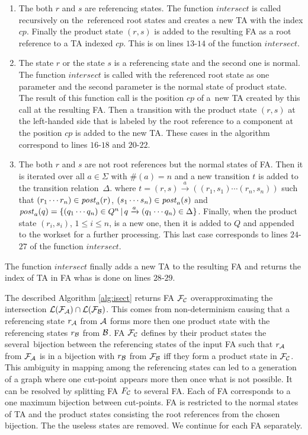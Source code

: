 \begin{enumerate}
	\item The both $r$ and $s$ are referencing states.
		The function $\mathit{intersect}$ is called recursively on the~referenced
		  root states and creates a new TA with the index $cp$.
		  Finally the product state $(r,s)$ is added to the resulting FA
		  as a root reference to a TA indexed $cp$.
		  This is on lines $13$-$14$ of the function $\mathit{intersect}$.
	  \item The state $r$ or the state $s$ is a referencing state and the second one is normal.
			The function $\mathit{intersect}$ is called with the referenced root state as one parameter
			and the second parameter is the normal state of product state.
    		The result of this function call is the position $cp$
			of a~new TA created by this call at the resulting FA.
    		Then a transition with the product state $(r,s)$ at the left-handed side
			that is labeled by the root reference to a component at the position $cp$
			is added to the new TA.
    		These cases in the algorithm correspond to lines $16$-$18$ and $20$-$22$.
	  \item The both $r$ and $s$ are not root references
			but the normal states of FA.
			Then it is iterated over all $a \in \Sigma$ with $\#(a) = n$
			and a new transition $t$ is added to the transition relation~$\Delta$.
			where $t = (r,s) \xrightarrow{a} ((r_1,s_1) \cdots (r_n, s_n))$ such that
			$(r_1 \cdots r_n) \in \mathit{post}_{a}(r)$, $(s_1 \cdots s_n) \in \mathit{post}_{a}(s)$ and
			$\mathit{post}_{a}(q) = \{(q_1 \cdots q_n) \in Q^n\,|\, q \xrightarrow{a} (q_1 \cdots q_n) \in \Delta\}$.
			Finally, when the product state $(r_i,s_i)$, $1 \leq i \leq n$, is a new one,
			then it is added to $Q$ and appended to the workset for a further processing.
			This last case corresponds to lines $24$-$27$ of the function $\mathit{intersect}$.
\end{enumerate}

The function $\mathit{intersect}$ finally adds a new TA to the resulting FA
and returns the index of TA in FA whas is done on lines $28$-$29$.

The described Algorithm \ref{alg:isect} returns FA $\mathcal{F}_{\mathcal{C}}$
overapproximating the intersection $\mathcal{L}(\mathcal{F}_{\mathcal{A}}) \cap \mathcal{L}(\mathcal{F}_{\mathcal{B}})$.
This comes from non-determinism causing that a referencing state $r_{\mathcal{A}}$ from $\mathcal{A}$
forms more then one product state with the referencing states $r_{\mathcal{B}}$ from $\mathcal{B}$.
FA $\mathcal{F}_{\mathcal{C}}$ defines by their product states the several~bijection between
the referencing states of the input FA
such that $r_{\mathcal{A}}$ from $\mathcal{F}_{\mathcal{A}}$ is in a bijection with $r_{\mathcal{B}}$ from $\mathcal{F}_{\mathcal{B}}$ iff
they form a product state in $\mathcal{F}_{\mathcal{C}}$.
This ambiguity in mapping among the referencing states
can led to a generation of a graph where one cut-point appears more then once
what is not possible.
It can be resolved by splitting FA $F_{\mathcal{C}}$ to several FA.
Each of FA corresponds to a one maximum bijection between cut-points.
FA is restricted to the normal states of TA and the product states
consisting the root references from the chosen bijection.
The the useless states are removed.
We continue for each FA separately.

